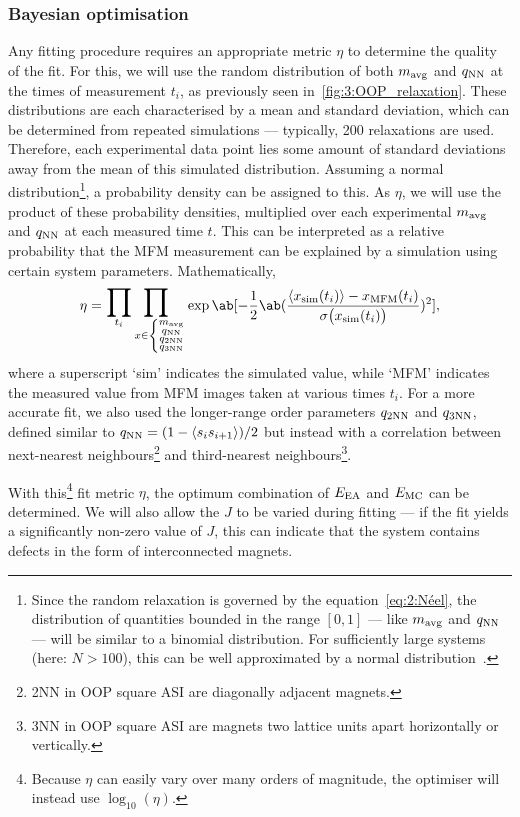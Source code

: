 \subsubsection{Bayesian optimisation}
Any fitting procedure requires an appropriate metric $\eta$ to determine the quality of the fit.
For this, we will use the random distribution of both $\mavg$ and $\qNN$ at the times of measurement $t_i$, as previously seen in~\cref{fig:3:OOP_relaxation}.
These distributions are each characterised by a mean and standard deviation, which can be determined from repeated simulations --- typically, 200 relaxations are used. %
Therefore, each experimental data point lies some amount of standard deviations away from the mean of this simulated distribution.
Assuming a normal distribution\footnote{
	Since the random relaxation is governed by the  equation~\eqref{eq:2:Néel}, the distribution of quantities bounded in the range $[0,1]$ --- like $\mavg$ and $\qNN$ --- will be similar to a binomial distribution.
	For sufficiently large systems (here: $N > 100$), this can be well approximated by a normal distribution~\cite{DeMoivreLaplaceTheorem}.
}, a probability density can be assigned to this.
As  $\eta$, we will use the product of these probability densities, multiplied over each experimental $\mavg$ and $\qNN$ at each measured time $t$.
This can be interpreted as a relative probability that the MFM measurement can be explained by a simulation using certain system parameters.
Mathematically,
\begin{equation}
	\eta = \bigprod_{t_i} \bigprod_{x \in \left\{\substack{\mavg\\\qNN\\\qNN[2]\\\qNN[3]}\right.} \exp\ab[-\frac{1}{2} \ab(\frac{\langle x_\mathrm{sim}(t_i) \rangle - x_\mathrm{MFM}(t_i)}{\sigma\big(x_\mathrm{sim}(t_i)\big)})^2] \mathrm{,}
\end{equation}
where a superscript `sim' indicates the simulated value, while `MFM' indicates the measured value from MFM images taken at various times $t_i$.
For a more accurate fit, we also used the longer-range order parameters $\qNN[2]$ and $\qNN[3]$, defined similar to $\qNN = (1 - \langle s_i s_{i+1} \rangle)/2$ but instead with a correlation between next-nearest neighbours\footnote{
	2NN in OOP square ASI are diagonally adjacent magnets.
} and third-nearest neighbours\footnote{
	3NN in OOP square ASI are magnets two lattice units apart horizontally or vertically.
}. \par
With this\footnote{
	Because $\eta$ can easily vary over many orders of magnitude, the optimiser will instead use $\log_{10}(\eta)$.
} fit metric $\eta$, the optimum combination of $\EEA$ and $\EMC$ can be determined.
We will also allow the  $J$ to be varied during fitting --- if the fit yields a significantly non-zero value of $J$, this can indicate that the system contains defects in the form of interconnected magnets. \par %

